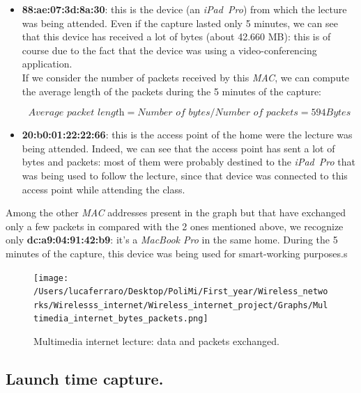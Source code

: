\begin{itemize}
    \item \textbf{88:ae:07:3d:8a:30}: this is the device (an \textit{iPad\ Pro}) from which the lecture 
            was being attended. Even if the capture lasted only 5 minutes, we can see that this 
            device has received a lot of bytes (about 42.660 MB): this is of course due to the fact
            that the device was using a video-conferencing application.\\ 
            If we consider the number of packets received by this \textit{MAC}, we can compute the 
            average length of the packets during the 5 minutes of the capture:

            \begin{equation}
                \textit{Average packet length} = \textit{Number of bytes} / \textit{Number of packets} = 594 Bytes
            \end{equation}

    \item \textbf{20:b0:01:22:22:66}: this is the access point of the home were the lecture was being
            attended. Indeed, we can see that the access point has sent a lot of bytes and packets: 
            most of them were probably destined to the \textit{iPad\ Pro} that was being used to
            follow the lecture, since that device was connected to this access point while attending 
            the class. 
\end{itemize}

Among the other \textit{MAC} addresses present in the graph but that have exchanged only a few 
packets in compared with the 2 ones mentioned above, we recognize only \textbf{dc:a9:04:91:42:b9}: 
it's a \textit{MacBook Pro} in the same home. During the 5 minutes of the capture, this device was 
being used for smart-working purposes.s

\begin{figure}[h!]
    \centering
    \texttt{[image: /Users/lucaferraro/Desktop/PoliMi/First\_year/Wireless\_networks/Wirelesss\_internet/Wireless\_internet\_project/Graphs/Multimedia\_internet\_bytes\_packets.png]}
    \caption{Multimedia internet lecture: data and packets exchanged.}
    \label{fig:Multimedia internet lecture: data and packets exchanged.}
\end{figure}




\subsection{Launch time capture.}
